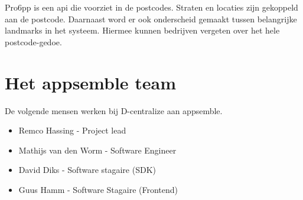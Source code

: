 Pro6pp is een api die voorziet in de postcodes. Straten en locaties zijn gekoppeld aan de postcode. Daarnaast word er ook onderscheid gemaakt tussen belangrijke landmarks in het systeem. Hiermee kunnen bedrijven vergeten over het hele postcode-gedoe.

\section{Het appsemble team}

De volgende mensen werken bij D-centralize aan appsemble.

\begin{itemize}
	\item Remco Hassing			- Project lead
	\item Mathijs van den Worm	- Software Engineer
	\item David Diks			- Software stagaire (SDK)
	\item Guus Hamm				- Software Stagaire (Frontend)
\end{itemize}